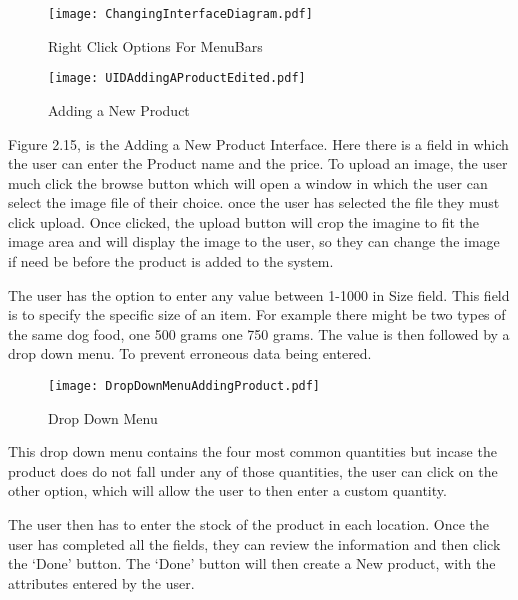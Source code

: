 \begin{figure}[H]
\caption{Right Click Options For MenuBars} \label{fig:Right Click Options For MenuBars}
\hfill\texttt{[image: ChangingInterfaceDiagram.pdf]}\hspace*{\fill}
\end{figure}

\pagebreak

\begin{figure}[H]
\caption{Adding a New Product} \label{fig:Adding a New Product Interface}
\hfill\texttt{[image: UIDAddingAProductEdited.pdf]}\hspace*{\fill}
\end{figure}

Figure 2.15, is the Adding a New Product Interface. Here there is a field in which the user can enter the Product name and the price. To upload an image, the user much click the browse button which will open a window in which the user can select the image file of their choice. once the user has selected the file they must click upload. Once clicked, the upload button will crop the imagine to fit the image area and will display the image to the user, so they can change the image if need be before the product is added to the system. \par

The user has the option to enter any value between 1-1000 in Size field.  This field is to specify the specific size of an item. For example there might be two types of the same dog food, one 500 grams one 750 grams. The value is then followed by a drop down menu. To prevent erroneous data being entered. \par


\begin{figure}[H]
\caption{Drop Down Menu} \label{fig:Drop Down Menu}
\hfill\texttt{[image: DropDownMenuAddingProduct.pdf]}\hspace*{\fill}
\end{figure}

This drop down menu contains the four most common quantities but incase the product does do not fall under any of those quantities, the user can click on the other option, which will allow the user to then enter a custom quantity. \par

The user then has to enter the stock of the product in each location. Once the user has completed all the fields, they can review the information and then click the `Done' button. The `Done' button will then create a New product, with the attributes entered by the user. \par

